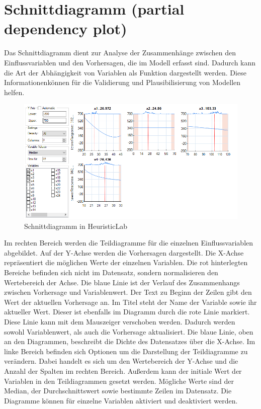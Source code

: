 \pagebreak

\section{Schnittdiagramm (partial dependency plot)}
\label{sec:partial-dependency-plot}

Das Schnittdiagramm dient zur Analyse der Zusammenhänge zwischen den Einflussvariablen und den Vorhersagen, die im Modell erfasst sind. Dadurch kann die Art der Abhängigkeit von Variablen als Funktion dargestellt werden. Diese Informationen\linebreak können für die Validierung und Plausibilisierung von Modellen helfen.

\begin{figure}[H]
    \centering
    \includegraphics[height=.5\textwidth]{images/intersection-plot.png}
    \caption{Schnittdiagramm in HeuristicLab}
    \label{fig:example_partial_dependency_plot}
\end{figure}

\noindent Im rechten Bereich werden die Teildiagramme für die einzelnen Einflussvariablen abgebildet. Auf der Y-Achse werden die Vorhersagen dargestellt.
Die X-Achse repräsentiert die möglichen Werte der einzelnen Variablen. Die rot hinterlegten Bereiche befinden sich nicht im Datensatz,
sondern normalisieren den Wertebereich der Achse.
Die blaue Linie ist der Verlauf des Zusammenhangs zwischen Vorhersage und Variablenwert.\newline\newline
Der Text zu Beginn der Zeilen gibt den Wert der aktuellen Vorhersage an.
Im Titel steht der Name der Variable sowie ihr aktueller Wert. Dieser ist ebenfalls im Diagramm durch die rote Linie markiert. 
Diese Linie kann mit dem Mauszeiger verschoben werden. Dadurch werden sowohl Variablenwert, als auch die Vorhersage aktualisiert.
Die blaue Linie, oben an den Diagrammen, beschreibt die Dichte des Datensatzes über die X-Achse.\newline\newline
Im linke Bereich befinden sich Optionen um die Darstellung der Teildiagramme zu verändern. Dabei handelt es sich um den Wertebereich der Y-Achse und die Anzahl der Spalten im rechten Bereich. Außerdem kann der initiale Wert der Variablen in den Teildiagrammen gesetzt werden. Mögliche Werte sind der Median, der Durchschnittswert sowie bestimmte Zeilen im Datensatz. Die Diagramme können für einzelne Variablen aktiviert und deaktiviert werden.